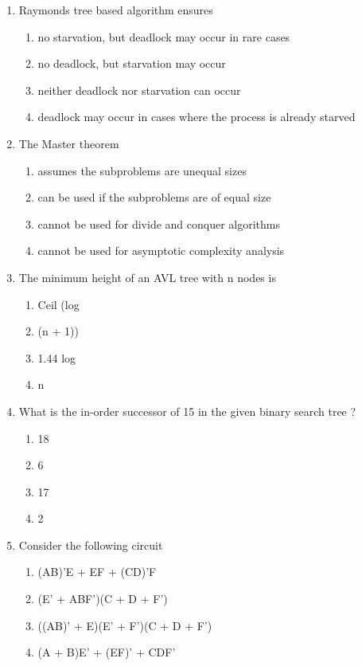 \documentclass[12pt]{article}
\begin{document}
\begin{enumerate}
\item[6.] Raymonds tree based algorithm ensures
\begin{enumerate}[label=\Alph*.]
  \item no starvation, but deadlock may occur in rare cases
  \item no deadlock, but starvation may occur
  \item neither deadlock nor starvation can occur
  \item deadlock may occur in cases where the process is already starved
\end{enumerate}

\item[7.] The Master theorem
\begin{enumerate}[label=\Alph*.]
  \item assumes the subproblems are unequal sizes
  \item can be used if the subproblems are of equal size
  \item cannot be used for divide and conquer algorithms
  \item cannot be used for asymptotic complexity analysis
\end{enumerate}

\item[8.] The minimum height of an AVL tree with n nodes is
\begin{enumerate}[label=\Alph*.]
  \item Ceil (log
  \item (n + 1))
  \item 1.44 log
  \item n
\end{enumerate}

\item[9.] What is the in-order successor of 15 in the given binary search tree ?
\begin{enumerate}[label=\Alph*.]
  \item 18
  \item 6
  \item 17
  \item 2
\end{enumerate}

\item[10.] Consider the following circuit
\begin{enumerate}[label=\Alph*.]
  \item (AB)'E + EF + (CD)'F
  \item (E' + ABF')(C + D + F')
  \item ((AB)' + E)(E' + F')(C + D + F')
  \item (A + B)E' + (EF)' + CDF'
\end{enumerate}


\end{enumerate}
\end{document}
